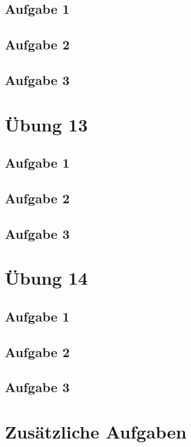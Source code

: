 \documentclass[a4paper]{article}
\begin{document}
\subsection{Aufgabe 1}

\subsection{Aufgabe 2}


\subsection{Aufgabe 3}




\newpage
\section{Übung 13}
\subsection{Aufgabe 1}

\subsection{Aufgabe 2}


\subsection{Aufgabe 3}




\newpage
\section{Übung 14}
\subsection{Aufgabe 1}

\subsection{Aufgabe 2}


\subsection{Aufgabe 3}




\newpage
\section{Zusätzliche Aufgaben}
\end{document}
